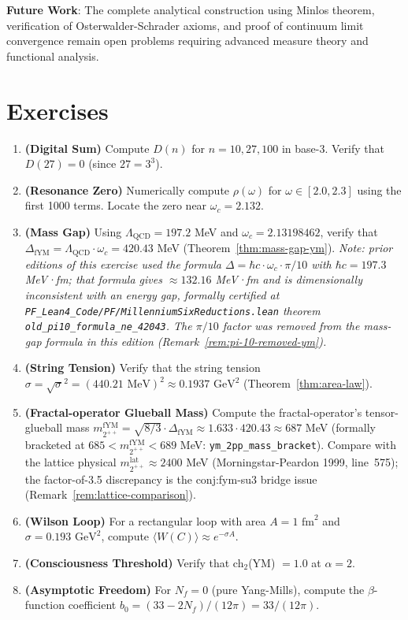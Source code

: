 \textbf{Future Work}: The complete analytical construction using Minlos theorem, verification of Osterwalder-Schrader axioms, and proof of continuum limit convergence remain open problems requiring advanced measure theory and functional analysis.

\section*{Exercises}

\begin{enumerate}
\item \textbf{(Digital Sum)} Compute $D(n)$ for $n = 10, 27, 100$ in base-3. Verify that $D(27) = 0$ (since $27 = 3^3$).

\item \textbf{(Resonance Zero)} Numerically compute $\rho(\omega)$ for $\omega \in [2.0, 2.3]$ using the first 1000 terms. Locate the zero near $\omega_c = 2.132$.

\item \textbf{(Mass Gap)} Using $\Lambda_{\mathrm{QCD}} = 197.2$ MeV and $\omega_c = 2.13198462$, verify that $\Delta_{\mathrm{fYM}} = \Lambda_{\mathrm{QCD}} \cdot \omega_c = 420.43$ MeV (Theorem~\ref{thm:mass-gap-ym}). \emph{Note: prior editions of this exercise used the formula $\Delta = \hbar c \cdot \omega_c \cdot \pi/10$ with $\hbar c = 197.3$ MeV·fm; that formula gives $\approx 132.16$ MeV·fm and is dimensionally inconsistent with an energy gap, formally certified at \texttt{PF\_Lean4\_Code/PF/MillenniumSixReductions.lean} theorem \texttt{old\_pi10\_formula\_ne\_42043}. The $\pi/10$ factor was removed from the mass-gap formula in this edition (Remark~\ref{rem:pi-10-removed-ym}).}

\item \textbf{(String Tension)} Verify that the string tension $\sigma = \sqrt{\sigma}^2 = (440.21 \text{ MeV})^2 \approx 0.1937 \text{ GeV}^2$ (Theorem~\ref{thm:area-law}).

\item \textbf{(Fractal-operator Glueball Mass)} Compute the fractal-operator's tensor-glueball mass $m_{2^{++}}^{\mathrm{fYM}} = \sqrt{8/3} \cdot \Delta_{\mathrm{fYM}} \approx 1.633 \cdot 420.43 \approx 687$ MeV (formally bracketed at $685 < m_{2^{++}}^{\mathrm{fYM}} < 689$ MeV: \texttt{ym\_2pp\_mass\_bracket}). Compare with the lattice physical $m_{2^{++}}^{\mathrm{lat}} \approx 2400$ MeV (Morningstar-Peardon 1999, line~575); the factor-of-3.5 discrepancy is the conj:fym-su3 bridge issue (Remark~\ref{rem:lattice-comparison}).

\item \textbf{(Wilson Loop)} For a rectangular loop with area $A = 1 \text{ fm}^2$ and $\sigma = 0.193 \text{ GeV}^2$, compute $\langle W(C) \rangle \approx e^{-\sigma A}$.

\item \textbf{(Consciousness Threshold)} Verify that ch$_2$(YM) $= 1.0$ at $\alpha = 2$.

\item \textbf{(Asymptotic Freedom)} For $N_f = 0$ (pure Yang-Mills), compute the $\beta$-function coefficient $b_0 = (33 - 2N_f)/(12\pi) = 33/(12\pi)$.
\end{enumerate}

